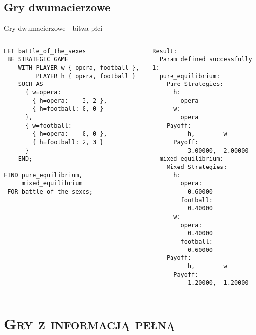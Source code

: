 \documentclass[xcolor=x11names,compress]{beamer}
\renewcommand{\(}{\begin{columns}}
\renewcommand{\)}{\end{columns}}
\newcommand{\<}[1]{\begin{column}{#1}}
\renewcommand{\>}{\end{column}}
\begin{document}
\subsection{Gry dwumacierzowe}
\begin{frame}[fragile]{Gry dwumacierzowe - bitwa płci}
\begin{columns}[c]
\begin{column}{.5\textwidth}
\begin{lstlisting}
LET battle_of_the_sexes
 BE STRATEGIC GAME
    WITH PLAYER w { opera, football },
         PLAYER h { opera, football }
    SUCH AS
      { w=opera:
        { h=opera:    3, 2 },
        { h=football: 0, 0 }
      },
      { w=football:
        { h=opera:    0, 0 },
        { h=football: 2, 3 }
      }
    END;
    
FIND pure_equilibrium,
     mixed_equilibrium
 FOR battle_of_the_sexes;
\end{lstlisting}
\end{column}
\hspace{5pt}\vrule\hspace{5pt}
\begin{column}{.5\textwidth}
\begin{lstlisting}
Result:
  Param defined successfully
1:
  pure_equilibrium:
    Pure Strategies:
      h:
        opera
      w:
        opera
    Payoff:
          h,        w
      Payoff:
          3.00000,  2.00000
  mixed_equilibrium:
    Mixed Strategies:
      h:
        opera:
          0.60000
        football:
          0.40000
      w:
        opera:
          0.40000
        football:
          0.60000
    Payoff:
          h,        w
      Payoff:
          1.20000,  1.20000
\end{lstlisting}
\end{column}
\end{columns}
\end{frame}


\section{\scshape Gry z informacją pełną}
\end{document}
